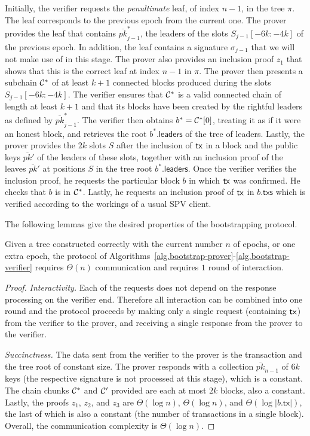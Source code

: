 Initially, the verifier requests the \emph{penultimate} leaf, of index $n-1$, in the tree $\pi$.
The leaf corresponds to the previous epoch from the current one.
The prover provides the leaf that contains $\overline{pk}^*_{j-1}$, the leaders of the
slots $S_{j-1}[-6k{:}-4k]$ of the previous epoch. In addition, the leaf contains a signature
$\sigma_{j-1}$ that we will not make use of in this stage. The prover also provides an inclusion
proof $z_1$ that shows that this is the correct leaf at index $n-1$ in $\pi$.
The prover then presents a subchain $\mathcal{C}^*$ of at least $k+1$ connected blocks produced
during the slots $S_{j-1}[-6k{:}-4k]$. The verifier ensures that $\mathcal{C}^*$ is a valid
connected chain of length at least $k+1$ and that its blocks have been created by the rightful
leaders as defined by $\overline{pk}^*_{j-1}$. The verifier then obtains $b^* = \mathcal{C}^*[0]$, treating
it as if it were an honest block, and retrieves the root $b^*\textsf{.leaders}$ of the tree of leaders.
Lastly, the prover provides the $2k$ slots $S$ after the inclusion of $\mathsf{tx}$ in a block and the
public keys $\overline{pk}'$ of the leaders of these slots, together with an inclusion proof of
the leaves $\overline{pk}'$ at positions $S$ in the tree root $b^*\textsf{.leaders}$. Once the verifier
verifies the inclusion proof, he requests the particular block $b$ in which $\mathsf{tx}$ was confirmed.
He checks that $b$ is in $\mathcal{C}^*$. Lastly, he requests an inclusion proof of $\mathsf{tx}$ in $b\textsf{.txs}$
which is verified according to the workings of a usual SPV client.

The following lemmas give the desired properties of the bootstrapping protocol.

\begin{lemma}
  Given a tree constructed correctly with the current number $n$ of epochs, or one extra epoch, the protocol
  of Algorithms~\ref{alg.bootstrap-prover}-\ref{alg.bootstrap-verifier}
  requires $\Theta(n)$ communication and requires $1$ round of interaction.
\end{lemma}
\begin{proof}
  \noindent
  \emph{Interactivity.}
  Each of the requests does not depend on the response
  processing on the verifier end. Therefore all interaction can be combined
  into one round and the protocol proceeds by making only a single request (containing $\mathsf{tx}$)
  from the verifier to the prover, and receiving a
  single response from the prover to the verifier. 

  \noindent
  \emph{Succinctness.}
  The data sent from the verifier to the prover is the transaction and the tree root of
  constant size. The prover responds with a collection $\overline{pk}_{n-1}$ of $6k$ keys
  (the respective signature is not processed at this stage), which is a constant. The
  chain chunks $\mathcal{C}^*$ and $\mathcal{C}'$ provided are each at most $2k$ blocks, also a constant.
  Lastly, the proofs $z_1$, $z_2$, and $z_3$ are $\Theta(\log n)$, $\Theta(\log n)$, and $\Theta(\log |b\textsf{.tx}|)$,
  the last of which is also a constant (the number of transactions in a single block).
  Overall, the communication complexity is $\Theta(\log n)$.
\end{proof}

